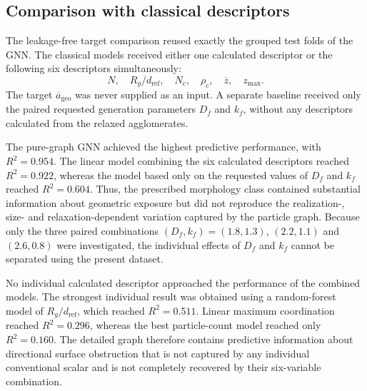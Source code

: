 \documentclass[12pt,a4paper]{article}
\begin{document}
\subsection{Comparison with classical descriptors}

The leakage-free target comparison reused exactly the grouped test folds of the
GNN. The classical models received either one calculated descriptor or the
following six descriptors simultaneously:
\begin{equation}
	N,\quad R_g/d_{\mathrm{ref}},\quad N_c,\quad \rho_c,\quad
	\overline{z},\quad z_{\max}.
\end{equation}
The target $\overline{a}_{\mathrm{geo}}$ was never supplied as an input. A
separate baseline received only the paired requested generation parameters
$D_f$ and $k_f$, without any descriptors calculated from the relaxed
agglomerates.

The pure-graph GNN achieved the highest predictive performance, with
$R^2=0.954$. The linear model combining the six calculated descriptors reached
$R^2=0.922$, whereas the model based only on the requested values of $D_f$ and
$k_f$ reached $R^2=0.604$. Thus, the prescribed morphology class contained
substantial information about geometric exposure but did not reproduce the
realization-, size- and relaxation-dependent variation captured by the
particle graph. Because only the three paired combinations
$(D_f,k_f)=(1.8,1.3)$, $(2.2,1.1)$ and $(2.6,0.8)$ were investigated, the
individual effects of $D_f$ and $k_f$ cannot be separated using the present
dataset.

No individual calculated descriptor approached the performance of the
combined models. The strongest individual result was obtained using a
random-forest model of $R_g/d_{\mathrm{ref}}$, which reached $R^2=0.511$.
Linear maximum coordination reached $R^2=0.296$, whereas the best
particle-count model reached only $R^2=0.160$. The detailed graph therefore
contains predictive information about directional surface obstruction that is
not captured by any individual conventional scalar and is not completely
recovered by their six-variable combination.
\end{document}
